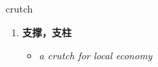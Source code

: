 
\begin{frame}
{\huge crutch}
\begin{center}
\begin{enumerate}\Large
  \item \textbf{支撑，支柱}
  \begin{itemize}
    \item \em{\Large{a crutch for local economy}}
  \end{itemize}
\end{enumerate}
\end{center}
\end{frame}
